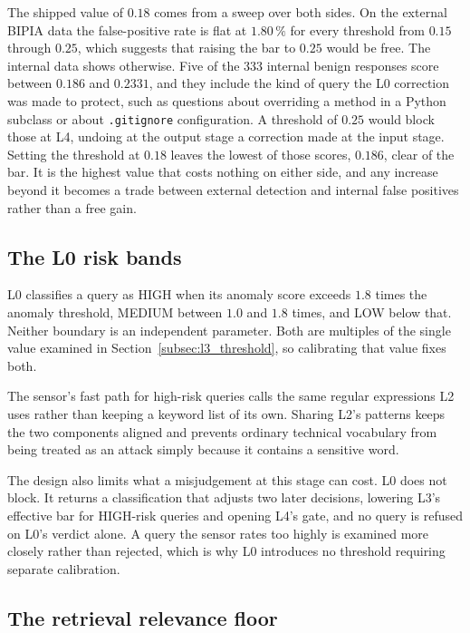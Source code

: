 The shipped value of $0.18$ comes from a sweep over both sides. On the external BIPIA data the false-positive rate is flat at $1.80\,\%$ for every threshold from $0.15$ through $0.25$, which suggests that raising the bar to $0.25$ would be free. The internal data shows otherwise. Five of the 333 internal benign responses score between $0.186$ and $0.2331$, and they include the kind of query the L0 correction was made to protect, such as questions about overriding a method in a Python subclass or about \texttt{.gitignore} configuration. A threshold of $0.25$ would block those at L4, undoing at the output stage a correction made at the input stage. Setting the threshold at $0.18$ leaves the lowest of those scores, $0.186$, clear of the bar. It is the highest value that costs nothing on either side, and any increase beyond it becomes a trade between external detection and internal false positives rather than a free gain.

\subsection{The L0 risk bands}
\label{subsec:l0_threshold}

L0 classifies a query as HIGH when its anomaly score exceeds $1.8$ times the anomaly threshold, MEDIUM between $1.0$ and $1.8$ times, and LOW below that. Neither boundary is an independent parameter. Both are multiples of the single value examined in Section~\ref{subsec:l3_threshold}, so calibrating that value fixes both.

The sensor's fast path for high-risk queries calls the same regular expressions L2 uses rather than keeping a keyword list of its own. Sharing L2's patterns keeps the two components aligned and prevents ordinary technical vocabulary from being treated as an attack simply because it contains a sensitive word.

The design also limits what a misjudgement at this stage can cost. L0 does not block. It returns a classification that adjusts two later decisions, lowering L3's effective bar for HIGH-risk queries and opening L4's gate, and no query is refused on L0's verdict alone. A query the sensor rates too highly is examined more closely rather than rejected, which is why L0 introduces no threshold requiring separate calibration.

\subsection{The retrieval relevance floor}
\label{subsec:retrieval_threshold}

